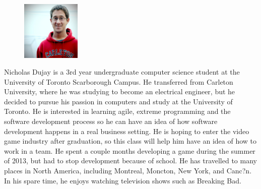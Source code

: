 \documentclass[pdftex,10pt,a4paper]{report}
\begin{document}
\begin{figure}
  \vspace{-20pt}
  \begin{center}
    \includegraphics[width=0.25\textwidth]{img/group/nick}
  \end{center}
  \vspace{-20pt}
\end{figure}
Nicholas Dujay is a 3rd year undergraduate computer science student at the University of Toronto Scarborough Campus. He transferred from Carleton University, where he was studying to become an electrical engineer, but he decided to pursue his passion in computers and study at the University of Toronto. He is interested in learning agile, extreme programming and the software development process so he can have an idea of how software development happens in a real business setting. He is hoping to enter the video game industry after graduation, so this class will help him have an idea of how to work in a team. He spent a couple months developing a game during the summer of 2013, but had to stop development because of school. He has travelled to many places in North America, including Montreal, Moncton, New York, and Canc?n. In his spare time, he enjoys watching television shows such as Breaking Bad.\\
\end{document}
